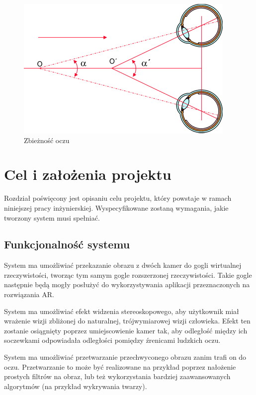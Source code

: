 \documentclass[a4paper,11pt,twoside]{report}
\theoremstyle{definition}
\begin{document}
\begin{figure}[h]
\centering
\includegraphics[scale=0.5]{images/zbieznosc}
\caption[Zbieżność oczu (źródło: http://www.swiatlo.tak.pl/1/index.php/funkcje-wzroku-akomodacja-adaptacja-zbieznosc/)]{Zbieżność oczu}
\end{figure}

\chapter{Cel i założenia projektu} %

Rozdział poświęcony jest opisaniu celu projektu, który powstaje w ramach niniejszej pracy inżynierskiej. Wyspecyfikowane zostaną wymagania, jakie tworzony system musi spełniać.

\section{Funkcjonalność systemu}
System ma umożliwiać przekazanie obrazu z dwóch kamer do gogli wirtualnej rzeczywistości, tworząc tym samym gogle rozszerzonej rzeczywistości. Takie gogle następnie będą mogły posłużyć do wykorzystywania aplikacji przeznaczonych na rozwiązania AR. 

System ma umożliwiać efekt widzenia stereoskopowego, aby użytkownik miał wrażenie wizji zbliżonej do naturalnej, trójwymiarowej wizji człowieka. Efekt ten zostanie osiągnięty poprzez umiejscowienie kamer tak, aby odległość między ich soczewkami odpowiadała odległości pomiędzy źrenicami ludzkich oczu. 

System ma umożliwiać przetwarzanie przechwyconego obrazu zanim trafi on do oczu. Przetwarzanie to może być realizowane na przykład poprzez nałożenie prostych filtrów na obraz, lub też wykorzystania bardziej zaawansowanych algorytmów (na przykład wykrywania twarzy).
\end{document}
